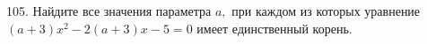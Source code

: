 105. Найдите все значения параметра $a,$ при каждом из которых уравнение
$(a + 3)x^2 - 2(a + 3)x - 5 = 0$ имеет единственный корень.\\
